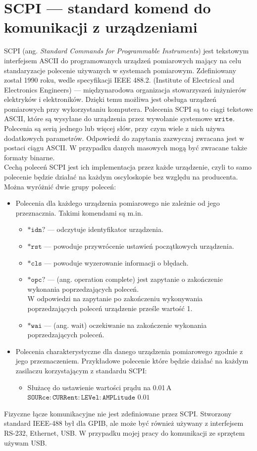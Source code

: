 \section{SCPI --- standard komend do komunikacji z urządzeniami}
SCPI (ang. \textit{Standard Commands for Programmable Instruments}) jest tekstowym interfejsem ASCII do programowanych
urządzeń pomiarowych mający na celu standaryzacje polecenie używanych w systemach pomiarowym. Zdefiniowany został 1990 roku,
wedle specyfikacji IEEE 488.2. (Institute of Electrical and Electronics Engineers) --- międzynarodowa organizacja stowarzyszeń
inżynierów elektryków i elektroników. Dzięki temu możliwa jest obsługa urządzeń pomiarowych przy wykorzystaniu komputera.
Polecenia SCPI są to ciągi tekstowe ASCII, które są wysyłane do urządzenia przez wywołanie systemowe $\mathtt{write}$.
Polecenia są serią jednego lub więcej słów, przy czym wiele z nich używa dodatkowych parametrów.
Odpowiedź do zapytania zazwyczaj zwracana jest w postaci ciągu ASCII.
W przypadku danych masowych mogą być zwracane także formaty binarne. \\

Cechą poleceń SCPI jest ich implementacja przez każde urządzenie, czyli to samo polecenie będzie działać na każdym oscyloskopie
bez względu na producenta. Można wyróżnić dwie grupy poleceń:
\begin{itemize}
\item Polecenia dla każdego urządzenia pomiarowego nie zależnie od jego przeznacznia. Takimi komendami są m.in.
\begin{itemize}
\item $\mathtt{*idn?}$ --- odczytuje identyfikator urządzenia.
\item $\mathtt{*rst}$ --- powoduje przywrócenie ustawień początkowych urządzenia.
\item $\mathtt{*cls}$ --- powoduje wyzerowanie informacji o błędach.
\item $\mathtt{*opc?}$ --- (ang. operation complete) jest zapytanie o zakończenie wykonania
poprzedzających poleceń. \\
W odpowiedzi na zapytanie po zakończeniu wykonywania poprzedzających poleceń urządzenie prześle wartość 1.
\item $\mathtt{*wai}$ --- (ang. wait) oczekiwanie na zakończenie wykonania poprzedzających poleceń.
\end{itemize}

\item Polecenia charakterystyczne dla danego urządzenia pomiarowego zgodnie z jego przeznaczeniem.
Przykładowe polecenie które będzie działać na każdym zasilaczu korzystającym z standardu SCPI:
\begin{itemize}
\item Służacę do ustawienie wartości prądu na 0.01\,A \\ $\mathtt{SOURce:CURRent:LEVel:AMPLitude}$ $\mathtt{0.01}$
\end{itemize}
\end{itemize}

Fizyczne łącze komunikacyjne nie jest zdefiniowane przez SCPI. Stworzony standard IEEE-488 był dla GPIB,
ale może być również używany z interfejsem RS-232, Ethernet, USB. W przypadku mojej pracy do komunikacji ze sprzętem
używam USB.
\newpage
